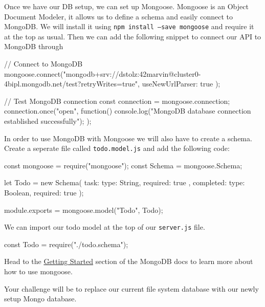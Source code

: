 \documentclass{42-en}
\begin{document}
Once we have our DB setup, we can set up Mongoose. Mongoose is an Object Document Modeler, it allows us to define a schema and easily connect to MongoDB. We will install it using \texttt{npm install --save mongoose} and require it at the top as usual. Then we can add the following snippet to connect our API to MongoDB through 

\begin{42jscode}
// Connect to MongoDB
mongoose.connect("mongodb+srv://dstolz:42marvin@cluster0-4bipl.mongodb.net/test?retryWrites=true",
	{ useNewUrlParser: true }
);

// Test MongoDB connection
const connection = mongoose.connection;
connection.once("open", function() {
	console.log("MongoDB database connection established successfully");
});
\end{42jscode}

In order to use MongoDB with Mongoose we will also have to create a schema. Create a seperate file called \texttt{todo.model.js} and add the following code:

\begin{42jscode}
const mongoose = require("mongoose");
const Schema = mongoose.Schema;

let Todo = new Schema({
  task: {
    type: String,
    required: true
  },
  completed: {
    type: Boolean,
    required: true
  }
});

module.exports = mongoose.model("Todo", Todo);
\end{42jscode}

We can import our todo model at the top of our \texttt{server.js} file.
\begin{42jscode}
const Todo = require("./todo.schema");
\end{42jscode}

Head to the \href{https://mongoosejs.com/docs/index.html}{Getting Started} section of the MongoDB docs to learn more about how to use mongoose.

Your challenge will be to replace our current file system database with our newly setup Mongo database.


\end{document}
